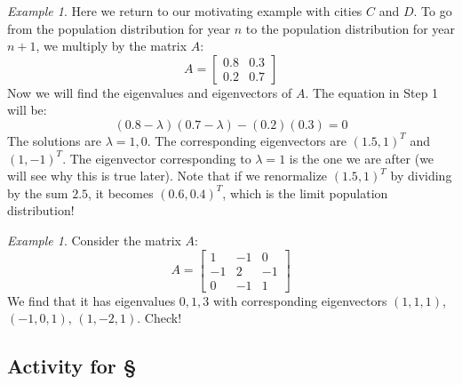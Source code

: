 \documentclass[11pt,oneside]{amsbook}
\theoremstyle{definition}
\theoremstyle{plain}
\theoremstyle{definition}
\theoremstyle{remark}
\newtheorem{example}[theorem]{Example}
\numberwithin{equation}{section}
\numberwithin{figure}{section}
\begin{document}
\begin{example}
  Here we return to our motivating example with cities $C$ and $D$. To go from the population distribution for year $n$ to the population distribution for year $n+1$, we multiply by the matrix $A$:
  \[A=\begin{bmatrix}0.8&0.3\\0.2&0.7\end{bmatrix}
  \]
  Now we will find the eigenvalues and eigenvectors of $A$. The equation in Step 1 will be:
  \[(0.8-\lambda)(0.7-\lambda)-(0.2)(0.3)=0
  \]
  The solutions are $\lambda=1,0$. The corresponding eigenvectors are $(1.5,1)^T$ and $(1,-1)^T$. The eigenvector corresponding to $\lambda=1$ is the one we are after (we will see why this is true later). Note that if we renormalize $(1.5,1)^T$ by dividing by the sum $2.5$, it becomes $(0.6,0.4)^T$, which is the limit population distribution!
\end{example}

\begin{example}
  Consider the matrix $A$:
  \[A=\begin{bmatrix}1&-1&0\\-1&2&-1\\0&-1&1\end{bmatrix}
  \]
  We find that it has eigenvalues $0,1,3$ with corresponding eigenvectors $(1,1,1)$, $(-1,0,1)$, $(1,-2,1)$. Check!
\end{example}


\newpage
\subsection*{Activity for \S \thesection}
\end{document}
